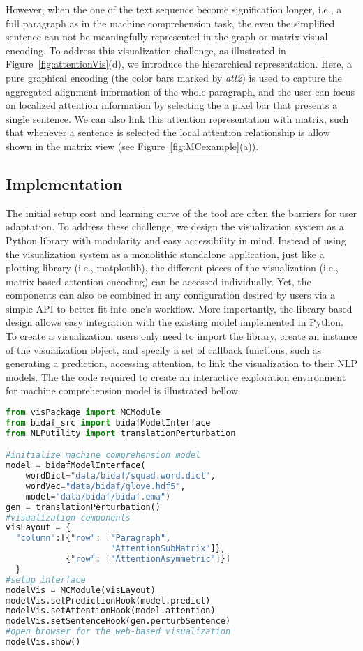 However, when the one of the text sequence become signification longer, i.e., a full paragraph as in the machine comprehension task, the even the simplified sentence can not be meaningfully represented in the graph or matrix visual encoding. To address this visualization challenge, as illustrated in Figure~\ref{fig:attentionVis}(d), we introduce the hierarchical representation. Here, a pure graphical encoding (the color bars marked by \emph{att2}) is used to capture the aggregated alignment information of the whole paragraph, and the user can focus on localized attention information by selecting the a pixel bar that presents a single sentence. We can also link this attention representation with matrix, such that whenever a sentence is selected the local attention relationship is allow shown in the matrix view (see Figure~\ref{fig:MCexample}(a)).

\subsection{Implementation}
The initial setup cost and learning curve of the tool are often the barriers for user adaptation. To address these challenge, we design the visualization system as a Python library with modularity and easy accessibility in mind.
Instead of using the visualization system as a monolithic standalone application, just like a plotting library (i.e., matplotlib), the different pieces of the visualization (i.e., matrix based attention encoding) can be accessed individually.
% 
Yet, the components can also be combined in any configuration desired by users via a simple API to better fit into one's workflow.
More importantly, the library-based design allows easy integration with the existing model implemented in Python.
%
To create a visualization, users only need to import the library, create an instance of the visualization object, and specify a set of callback functions, such as generating a prediction, accessing attention, to link the visualization to their NLP models. The the code required to create an interactive exploration environment for machine comprehension model is illustrated bellow.

\begin{lstlisting}[language=Python, caption=Code for setting up the visualization system shown in Figure~\ref{fig:MCexample}(a).]
from visPackage import MCModule
from bidaf_src import bidafModelInterface
from NLPutility import translationPerturbation

#initialize machine comprehension model
model = bidafModelInterface(
    wordDict="data/bidaf/squad.word.dict",
    wordVec="data/bidaf/glove.hdf5",
    model="data/bidaf/bidaf.ema")
gen = translationPerturbation()
#visualization components
visLayout = {
  "column":[{"row": ["Paragraph", 
                     "AttentionSubMatrix"]},
            {"row": ["AttentionAsymmetric"]}]
  }
#setup interface
modelVis = MCModule(visLayout)
modelVis.setPredictionHook(model.predict)
modelVis.setAttentionHook(model.attention)
modelVis.setSentenceHook(gen.perturbSentence)
#open browser for the web-based visualization
modelVis.show()
\end{lstlisting}




